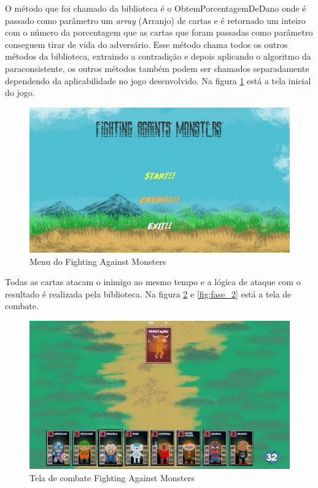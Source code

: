 O método que foi chamado da biblioteca é o ObtemPorcentagemDeDano onde é passado como parâmetro um \textit{array} (Arranjo) de cartas e é retornado um inteiro com o número da porcentagem que as cartas que foram passadas como parâmetro conseguem tirar de vida do adversário. Esse método chama todos os outros métodos da biblioteca, extraindo a contradição e depois aplicando o algoritmo da paraconsistente, os outros métodos também podem ser chamados separadamente dependendo da aplicabilidade no jogo desenvolvido. Na figura \ref{fig:menu} está a tela inicial do jogo.

\begin{figure}[htb]
	\caption{
		\label{fig:menu} 
		Menu do Fighting Against Monsters
	}
	\begin{center}
		\includegraphics[scale=0.5]{imagens/menu.jpeg}
	\end{center}
\end{figure}

\newpage

Todas as cartas atacam o inimigo ao mesmo tempo e a lógica de ataque com o resultado é realizada pela biblioteca. Na figura \ref{fig:fase_1} e \ref{fig:fase_2} está a tela de combate.

\begin{figure}[htb]
	\caption{
		\label{fig:fase_1} 
		Tela de combate Fighting Against Monsters
	}
	\begin{center}
		\includegraphics[scale=0.5]{imagens/fase_1.jpeg}
	\end{center}
\end{figure}

